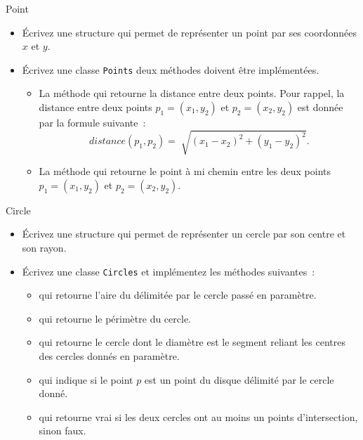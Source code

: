 \documentclass[a4paper,11pt]{article}
\begin{document}
	\begin{Exercice}{Point}
		\begin{itemize}
			\item
				Écrivez une structure qui permet de représenter un point par ses coordonnées $x$ et $y$.
			\item 
				Écrivez une classe \texttt{Points} deux méthodes doivent être implémentées.
				\begin{itemize}
					\item 
						La méthode  qui retourne la distance entre deux points. Pour rappel, la distance entre deux points $p_1 = (x_1, y_2)$ et $p_2 = (x_2, y_2)$ est donnée par la formule suivante~:
						$$
							distance(p_1, p_2) = \sqrt[]{(x_1 - x_2)^2 + (y_1 - y_2)^2}.
						$$
					\item 
						La méthode  qui retourne le point à mi chemin entre les deux points $p_1 = (x_1, y_2)$ et $p_2 = (x_2, y_2)$.
				\end{itemize}
		\end{itemize}		
	\end{Exercice}

	\begin{Exercice}{Circle}
		\begin{itemize}
			\item
				Écrivez une structure qui permet de représenter un cercle par son centre et son rayon.
			\item
				Écrivez une classe \texttt{Circles} et implémentez les méthodes suivantes~:
				\begin{itemize}
					\item 
						 qui retourne l'aire du délimitée par le cercle passé en paramètre.
					\item
						 qui retourne le périmètre du cercle.
					\item  
						 qui retourne le cercle dont le diamètre est le segment reliant les centres des cercles donnés en paramètre.
					\item  
						 qui indique si le point $p$ est un point du disque délimité par le cercle donné.
					\item  
						 qui retourne vrai si les deux cercles ont au moins un points d'intersection, sinon faux.
				\end{itemize}
		\end{itemize}		
	\end{Exercice}
\end{document}
